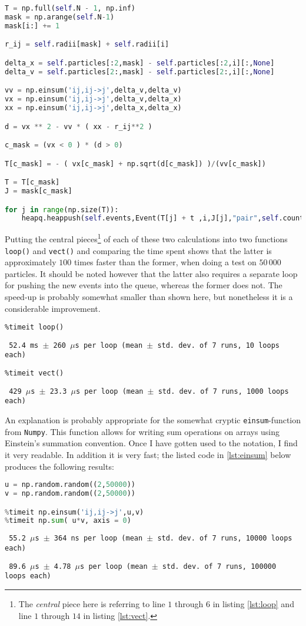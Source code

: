 \begin{lstlisting}[language=Python, caption= Vectorized calculation., label={lst:vect}]
T = np.full(self.N - 1, np.inf)
mask = np.arange(self.N-1)
mask[i:] += 1

r_ij = self.radii[mask] + self.radii[i]

delta_x = self.particles[:2,mask] - self.particles[:2,i][:,None]
delta_v = self.particles[2:,mask] - self.particles[2:,i][:,None]

vv = np.einsum('ij,ij->j',delta_v,delta_v)
vx = np.einsum('ij,ij->j',delta_v,delta_x)
xx = np.einsum('ij,ij->j',delta_x,delta_x)

d = vx ** 2 - vv * ( xx - r_ij**2 )

c_mask = (vx < 0 ) * (d > 0)

T[c_mask] = - ( vx[c_mask] + np.sqrt(d[c_mask]) )/(vv[c_mask])

T = T[c_mask]
J = mask[c_mask]

for j in range(np.size(T)):
	heapq.heappush(self.events,Event(T[j] + t ,i,J[j],"pair",self.count[i], self.count[J[j]]))
\end{lstlisting}

Putting the central pieces\footnote{The \textit{central} piece here is referring to line $1$ through $6$ in listing \ref{lst:loop} and line $1$ through $14$ in listing \ref{lst:vect}.} of each of these two calculations into two functions \texttt{loop()} and \texttt{vect()} and comparing the time spent shows that the latter is approximately $100$ times faster than the former, when doing a test on $50\,000$ particles. It should be noted however that the latter also requires a separate loop for pushing the new events into the queue, whereas the former does not. The speed-up is probably somewhat smaller than shown here, but nonetheless it is a considerable improvement.

\begin{lstlisting}
%timeit loop()
\end{lstlisting}
\texttt{\small
52.4 ms $\pm$ 260 $\mu$s per loop (mean $\pm$ std. dev. of 7 runs, 10 loops each)
}

\begin{lstlisting}
%timeit vect()
\end{lstlisting}
\texttt{\small
429 $\mu$s $\pm$ 23.3 $\mu$s per loop (mean $\pm$ std. dev. of 7 runs, 1000 loops each)
}


An explanation is probably appropriate for the somewhat cryptic \texttt{einsum}-function from \texttt{Numpy}. This function allows for writing sum operations on arrays using Einstein's summation convention. Once I have gotten used to the notation, I find it very readable. In addition it is very fast; the listed code in \ref{lst:einsum} below produces the following results: 
\begin{lstlisting}[language=Python,label={lst:einsum},caption={Timing einsum.}]
u = np.random.random((2,50000))
v = np.random.random((2,50000))

%timeit np.einsum('ij,ij->j',u,v)
%timeit np.sum( u*v, axis = 0)
\end{lstlisting}
\texttt{\small
	55.2 $\mu$s $\pm$ 364 ns per loop (mean $\pm$ std. dev. of 7 runs, 10000 loops each)
}

\texttt{\small 
	89.6 $\mu$s $\pm$ 4.78 $\mu$s per loop (mean $\pm$ std. dev. of 7 runs, 100000 loops each)
}